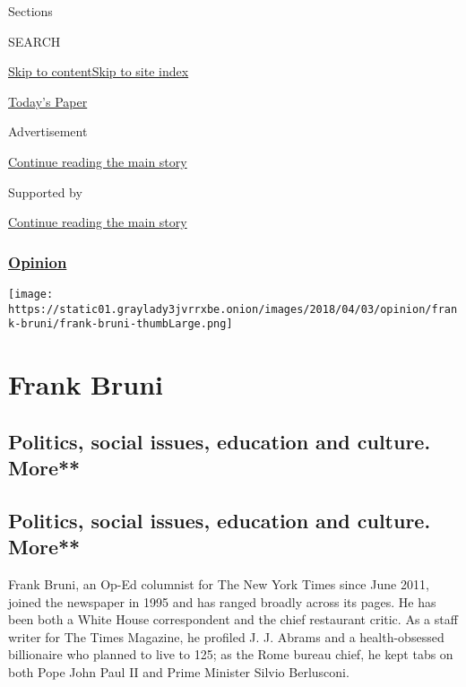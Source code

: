 Sections

SEARCH

\protect\hyperlink{site-content}{Skip to
content}\protect\hyperlink{site-index}{Skip to site index}

\href{https://myaccount.nytimes3xbfgragh.onion/auth/login?response_type=cookie\&client_id=vi}{}

\href{https://www.nytimes3xbfgragh.onion/section/todayspaper}{Today's
Paper}

Advertisement

\protect\hyperlink{after-top}{Continue reading the main story}

Supported by

\protect\hyperlink{after-sponsor}{Continue reading the main story}

\hypertarget{opinion}{%
\subsubsection{\texorpdfstring{\href{/section/opinion}{Opinion}}{Opinion}}\label{opinion}}

\texttt{[image: https://static01.graylady3jvrrxbe.onion/images/2018/04/03/opinion/frank-bruni/frank-bruni-thumbLarge.png]}

\hypertarget{frank-bruni}{%
\section{Frank Bruni}\label{frank-bruni}}

\hypertarget{politics-social-issues-education-and-culture-more}{%
\subsection{Politics, social issues, education and culture.
More**}\label{politics-social-issues-education-and-culture-more}}

\hypertarget{politics-social-issues-education-and-culture-more-1}{%
\subsection{Politics, social issues, education and culture.
More**}\label{politics-social-issues-education-and-culture-more-1}}

Frank Bruni, an Op-Ed columnist for The New York Times since June 2011,
joined the newspaper in 1995 and has ranged broadly across its pages. He
has been both a White House correspondent and the chief restaurant
critic. As a staff writer for The Times Magazine, he profiled J. J.
Abrams and a health-obsessed billionaire who planned to live to 125; as
the Rome bureau chief, he kept tabs on both Pope John Paul II and Prime
Minister Silvio Berlusconi.

